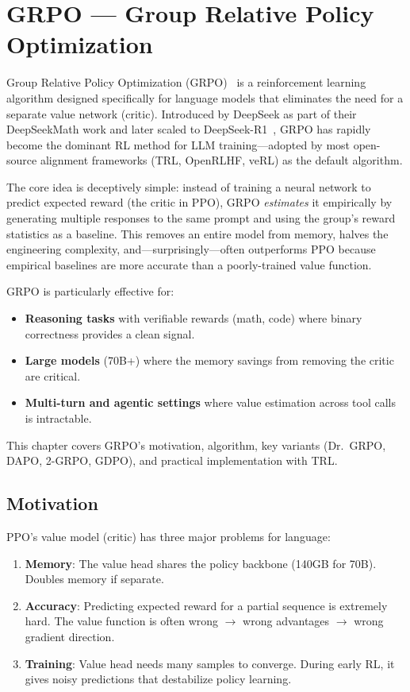 \chapter{GRPO --- Group Relative Policy Optimization}
\label{grpo-group-relative-policy-optimization}

Group Relative Policy Optimization (GRPO)~\cite{shao2024deepseekmath} is a reinforcement learning algorithm designed specifically for language models that eliminates the need for a separate value network (critic). Introduced by DeepSeek as part of their DeepSeekMath work and later scaled to DeepSeek-R1~\cite{deepseek2025r1}, GRPO has rapidly become the dominant RL method for LLM training---adopted by most open-source alignment frameworks (TRL, OpenRLHF, veRL) as the default algorithm.

The core idea is deceptively simple: instead of training a neural network to predict expected reward (the critic in PPO), GRPO \emph{estimates} it empirically by generating multiple responses to the same prompt and using the group’s reward statistics as a baseline. This removes an entire model from memory, halves the engineering complexity, and---surprisingly---often outperforms PPO because empirical baselines are more accurate than a poorly-trained value function.

GRPO is particularly effective for:

\begin{itemize}
  \item \textbf{Reasoning tasks} with verifiable rewards (math, code) where binary correctness provides a clean signal.
  \item \textbf{Large models} (70B+) where the memory savings from removing the critic are critical.
  \item \textbf{Multi-turn and agentic settings} where value estimation across tool calls is intractable.
\end{itemize}

This chapter covers GRPO’s motivation, algorithm, key variants (Dr.~GRPO, DAPO, 2-GRPO, GDPO), and practical implementation with TRL.

\section{Motivation}
\label{motivation}

PPO’s value model (critic) has three major problems for language:

\begin{enumerate}
  \item \textbf{Memory}: The value head shares the policy backbone (140GB for 70B). Doubles memory if separate.
  \item \textbf{Accuracy}: Predicting expected reward for a partial sequence is extremely hard. The value function is often wrong $\rightarrow$ wrong advantages $\rightarrow$ wrong gradient direction.
  \item \textbf{Training}: Value head needs many samples to converge. During early RL, it gives noisy predictions that destabilize policy learning.
\end{enumerate}

